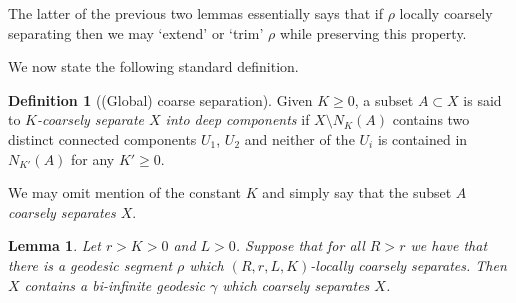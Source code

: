 \documentclass[10pt,a4paper]{amsart}
\newtheorem{lemma}[theorem]{Lemma}
\theoremstyle{definition}
\newtheorem{definition}[theorem]{Definition}
\begin{document}
The latter of the previous two lemmas essentially says that if $\rho$ locally coarsely separating then we may `extend' or `trim' $\rho$ while preserving this property. 

We now state the following standard definition.

\begin{definition}[(Global) coarse separation]
    Given $K \geq 0$, a subset $A \subset X$ is said to \textit{$K$-coarsely separate $X$ into deep components} if $X \setminus N_K(A)$ contains two distinct connected components $U_1$, $U_2$ and neither of the $U_i$ is contained in $N_{K'}(A)$ for any $K' \geq 0$. 

    
\end{definition}

We may omit mention of the constant $K$ and simply say that the subset \textit{$A$ coarsely separates $X$}.


\begin{lemma}\label{lem:coarsely-sep-geodesic}
    Let $r > K > 0$ and $L > 0$. Suppose that for all $R > r$ we have that there is a geodesic segment $\rho$ which $(R,r, L, K)$-locally coarsely separates. 
    Then $X$ contains a bi-infinite geodesic $\gamma$ which coarsely separates $X$. 
\end{lemma}
\end{document}

